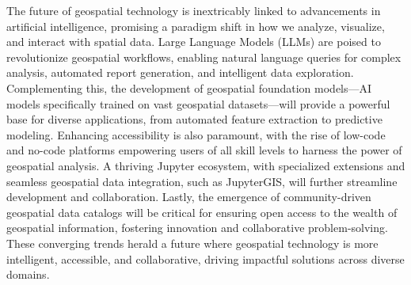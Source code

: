The future of geospatial technology is inextricably linked to advancements in artificial intelligence, promising a paradigm shift in how we analyze, visualize, and interact with spatial data. Large Language Models (LLMs) are poised to revolutionize geospatial workflows, enabling natural language queries for complex analysis, automated report generation, and intelligent data exploration. Complementing this, the development of geospatial foundation models—AI models specifically trained on vast geospatial datasets—will provide a powerful base for diverse applications, from automated feature extraction to predictive modeling. Enhancing accessibility is also paramount, with the rise of low-code and no-code platforms empowering users of all skill levels to harness the power of geospatial analysis. A thriving Jupyter ecosystem, with specialized extensions and seamless geospatial data integration, such as JupyterGIS, will further streamline development and collaboration. Lastly, the emergence of community-driven geospatial data catalogs will be critical for ensuring open access to the wealth of geospatial information, fostering innovation and collaborative problem-solving. These converging trends herald a future where geospatial technology is more intelligent, accessible, and collaborative, driving impactful solutions across diverse domains.


